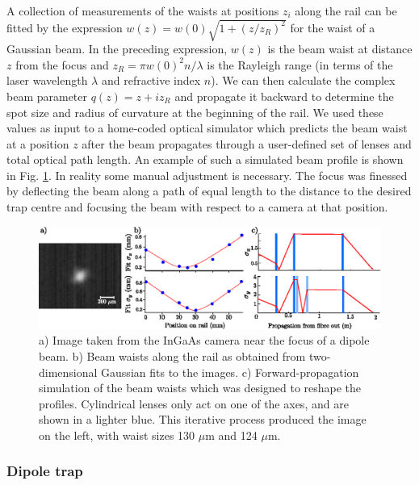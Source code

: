 	A collection of measurements of the waists at positions $z_i$ along the rail can be fitted by the expression $w(z) = w(0)\sqrt{1 + (z/z_R)^2}$ for the waist of a Gaussian beam.
	In the preceding expression, $w(z)$ is the beam waist at distance $z$ from the focus and $z_R=\pi w(0)^2n/\lambda$ is the Rayleigh range (in terms of the laser wavelength $\lambda$ and refractive index $n$).
	We can then calculate the complex beam parameter $q(z) = z + i z_R$ and propagate it backward to determine the spot size and radius of curvature at the beginning of the rail.
	We used these values as input to a home-coded optical simulator which predicts the beam waist at a position $z$ after the beam propagates through a user-defined set of lenses and total optical path length.
	An example of such a simulated beam profile is shown in Fig. \ref{fig:profiling}.
	In reality some manual adjustment is necessary.
	The focus was finessed by deflecting the beam along a path of equal length to the distance to the desired trap centre and focusing the beam with respect to a camera at that position.

	\begin{figure}
	\includegraphics[width=\textwidth]{fig/lattice/dipole_profle_combo}
	\caption{a) Image taken from the InGaAs camera near the focus of a dipole beam.
	b) Beam waists along the rail as obtained from two-dimensional Gaussian fits to the images.
	c) Forward-propagation simulation of the beam waists which was designed to reshape the profiles.
	Cylindrical lenses only act on one of the axes, and are shown in a lighter blue.
	This iterative process produced the image on the left, with waist sizes 130 $\mu$m and 124 $\mu$m.}
	\label{fig:profiling}
	\end{figure}



\subsubsection{Dipole trap}
\label{sec:dipole_trap}

